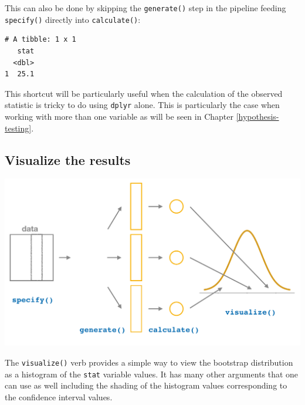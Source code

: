 \documentclass[12pt, krantz2,]{krantz}
\makeatletter
\newenvironment{Shaded}{\begin{snugshade}}{\end{snugshade}}
\newcommand{\DataTypeTok}[1]{\textcolor[rgb]{0.27,0.27,0.27}{#1}}
\newcommand{\DecValTok}[1]{\textcolor[rgb]{0.06,0.06,0.06}{#1}}
\newcommand{\KeywordTok}[1]{\textcolor[rgb]{0.27,0.27,0.27}{\textbf{#1}}}
\newcommand{\NormalTok}[1]{#1}
\newcommand{\OperatorTok}[1]{\textcolor[rgb]{0.43,0.43,0.43}{\textbf{#1}}}
\newcommand{\StringTok}[1]{\textcolor[rgb]{0.5,0.5,0.5}{#1}}
\newenvironment{kframe}{%
\medskip{}
\setlength{\fboxsep}{.8em}
 \def\at@end@of@kframe{}%
 \ifinner\ifhmode%
  \def\at@end@of@kframe{\end{minipage}}%
  \begin{minipage}{\columnwidth}%
 \fi\fi%
 \def\FrameCommand##1{\hskip\@totalleftmargin \hskip-\fboxsep
 \colorbox{shadecolor}{##1}\hskip-\fboxsep
     \hskip-\linewidth \hskip-\@totalleftmargin \hskip\columnwidth}%
 \MakeFramed {\advance\hsize-\width
   \@totalleftmargin\z@ \linewidth\hsize
   \@setminipage}}%
 {\par\unskip\endMakeFramed%
 \at@end@of@kframe}
\renewenvironment{Shaded}{\begin{kframe}}{\end{kframe}}
\makeatother
\begin{document}
This can also be done by skipping the \texttt{generate()} step in the pipeline feeding \texttt{specify()} directly into \texttt{calculate()}:

\begin{Shaded}
\end{Shaded}

\begin{verbatim}
# A tibble: 1 x 1
   stat
  <dbl>
1  25.1
\end{verbatim}

This shortcut will be particularly useful when the calculation of the observed statistic is tricky to do using \texttt{dplyr} alone. This is particularly the case when working with more than one variable as will be seen in Chapter \ref{hypothesis-testing}.

\hypertarget{visualize-the-results}{%
\subsection{Visualize the results}\label{visualize-the-results}}

\begin{center}\includegraphics[width=\textwidth]{images/flowcharts/infer/visualize} \end{center}

The \texttt{visualize()} verb provides a simple way to view the bootstrap distribution as a histogram of the \texttt{stat} variable values. It has many other arguments that one can use as well including the shading of the histogram values corresponding to the confidence interval values.
\end{document}
